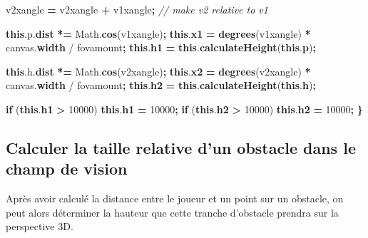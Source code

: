 \documentclass[11pt,french,a4paper,]{article}
\newenvironment{Shaded}{\begin{snugshade}}{\end{snugshade}}
\newcommand{\AttributeTok}[1]{\textcolor[rgb]{0.00,0.36,0.77}{\textbf{#1}}}
\newcommand{\CommentTok}[1]{\textcolor[rgb]{0.35,0.35,0.35}{\textit{#1}}}
\newcommand{\ControlFlowTok}[1]{\textcolor[rgb]{0.68,0.35,0.62}{\textbf{#1}}}
\newcommand{\DecValTok}[1]{\textcolor[rgb]{0.00,0.00,0.81}{#1}}
\newcommand{\KeywordTok}[1]{\textcolor[rgb]{0.68,0.35,0.62}{\textbf{#1}}}
\newcommand{\NormalTok}[1]{#1}
\newcommand{\OperatorTok}[1]{\textcolor[rgb]{0.81,0.36,0.00}{\textbf{#1}}}
\newcommand{\VariableTok}[1]{\textcolor[rgb]{0.90,0.33,0.00}{#1}}
\begin{document}
\begin{Shaded}
\begin{Highlighting}[]
\NormalTok{    v2xangle }\OperatorTok{=}\NormalTok{ v2xangle }\OperatorTok{+}\NormalTok{ v1xangle}\OperatorTok{;} \CommentTok{// make v2 relative to v1}

    \KeywordTok{this}\NormalTok{.}\VariableTok{p}\NormalTok{.}\AttributeTok{dist} \OperatorTok{*=} \VariableTok{Math}\NormalTok{.}\AttributeTok{cos}\NormalTok{(v1xangle)}\OperatorTok{;}
    \KeywordTok{this}\NormalTok{.}\AttributeTok{x1} \OperatorTok{=} \AttributeTok{degrees}\NormalTok{(v1xangle) }\OperatorTok{*} \VariableTok{canvas}\NormalTok{.}\AttributeTok{width}\NormalTok{ / fovamount}\OperatorTok{;}
    \KeywordTok{this}\NormalTok{.}\AttributeTok{h1} \OperatorTok{=} \KeywordTok{this}\NormalTok{.}\AttributeTok{calculateHeight}\NormalTok{(}\KeywordTok{this}\NormalTok{.}\AttributeTok{p}\NormalTok{)}\OperatorTok{;}

    \KeywordTok{this}\NormalTok{.}\VariableTok{h}\NormalTok{.}\AttributeTok{dist} \OperatorTok{*=} \VariableTok{Math}\NormalTok{.}\AttributeTok{cos}\NormalTok{(v2xangle)}\OperatorTok{;}
    \KeywordTok{this}\NormalTok{.}\AttributeTok{x2} \OperatorTok{=} \AttributeTok{degrees}\NormalTok{(v2xangle) }\OperatorTok{*} \VariableTok{canvas}\NormalTok{.}\AttributeTok{width}\NormalTok{ / fovamount}\OperatorTok{;}
    \KeywordTok{this}\NormalTok{.}\AttributeTok{h2} \OperatorTok{=} \KeywordTok{this}\NormalTok{.}\AttributeTok{calculateHeight}\NormalTok{(}\KeywordTok{this}\NormalTok{.}\AttributeTok{h}\NormalTok{)}\OperatorTok{;}

    \ControlFlowTok{if}\NormalTok{ (}\KeywordTok{this}\NormalTok{.}\AttributeTok{h1} \OperatorTok{>} \DecValTok{10000}\NormalTok{) }\KeywordTok{this}\NormalTok{.}\AttributeTok{h1} \OperatorTok{=} \DecValTok{10000}\OperatorTok{;}
    \ControlFlowTok{if}\NormalTok{ (}\KeywordTok{this}\NormalTok{.}\AttributeTok{h2} \OperatorTok{>} \DecValTok{10000}\NormalTok{) }\KeywordTok{this}\NormalTok{.}\AttributeTok{h2} \OperatorTok{=} \DecValTok{10000}\OperatorTok{;}
\OperatorTok{\}}
\end{Highlighting}
\end{Shaded}

\hypertarget{calculer-la-taille-relative-dun-obstacle-dans-le-champ-de-vision}{%
\subsection{Calculer la taille relative d'un obstacle dans le champ de
vision}\label{calculer-la-taille-relative-dun-obstacle-dans-le-champ-de-vision}}

Après avoir calculé la distance entre le joueur et un point sur un
obstacle, on peut alors déterminer la hauteur que cette tranche
d'obstacle prendra sur la perspective 3D.
\end{document}
